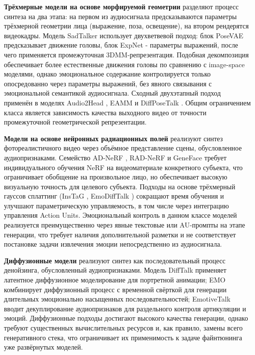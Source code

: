 \documentclass[a4paper, 12pt, oneside, openany]{article}
\begin{document}
\textbf{Трёхмерные модели на основе морфируемой геометрии} разделяют процесс синтеза на два этапа: на первом из аудиосигнала предсказываются параметры трёхмерной геометрии лица (выражение, поза, освещение), на втором рендерятся видеокадры. Модель SadTalker \cite{zhang2023sadtalker} использует двухветвевой подход: блок PoseVAE предсказывает движение головы, блок ExpNet - параметры выражений, после чего применяется промежуточная 3DMM-репрезентация. Подобная декомпозиция обеспечивает более естественные движения головы по сравнению с image-space моделями, однако эмоциональное содержание контролируется только опосредованно через параметры выражений, без явного связывания с эмоциональной семантикой аудиосигнала. Сходный двухэтапный подход применён в моделях Audio2Head \cite{wang2021audio2head}, EAMM \cite{ji2022eamm} и DiffPoseTalk \cite{sun2024diffposetalk}. Общим ограничением класса является зависимость качества выходного видео от точности промежуточной геометрической репрезентации.

\textbf{Модели на основе нейронных радиационных полей} реализуют синтез фотореалистичного видео через объёмное представление сцены, обусловленное аудиопризнаками. Семейство AD-NeRF \cite{guo2021adnerf}, RAD-NeRF \cite{tang2022radnerf} и GeneFace \cite{ye2023geneface} требует индивидуального обучения NeRF на видеоматериале конкретного субъекта, что ограничивает обобщение на произвольное лицо, но обеспечивает высокую визуальную точность для целевого субъекта. Подходы на основе трёхмерный гауссов сплаттинг (InsTaG \cite{li2025instag}, EmoDiffTalk \cite{liu2026emodifftalk}) сокращают время обучения и улучшают параметрическую управляемость, в том числе через интеграцию управления Action Units. Эмоциональный контроль в данном классе моделей реализуется преимущественно через явные текстовые или AU-промпты на этапе генерации, что требует наличия дополнительной разметки и не соответствует постановке задачи извлечения эмоции непосредственно из аудиосигнала.

\textbf{Диффузионные модели} реализуют синтез как последовательный процесс денойзинга, обусловленный аудиопризнаками. Модель DiffTalk \cite{shen2023difftalk} применяет латентное диффузионное моделирование для портретной анимации; EMO \cite{tian2024emo} комбинирует диффузионный процесс с временной свёрткой для генерации длительных эмоционально насыщенных последовательностей; EmotiveTalk \cite{wang2025emotivetalk} вводит декуплирование аудиопризнаков для раздельного контроля артикуляции и эмоций. Диффузионные подходы достигают высокого качества генерации, однако требуют существенных вычислительных ресурсов и, как правило, замены всего генеративного стека, что ограничивает их применимость к задаче файнтюнинга уже развёрнутых моделей.
\end{document}
